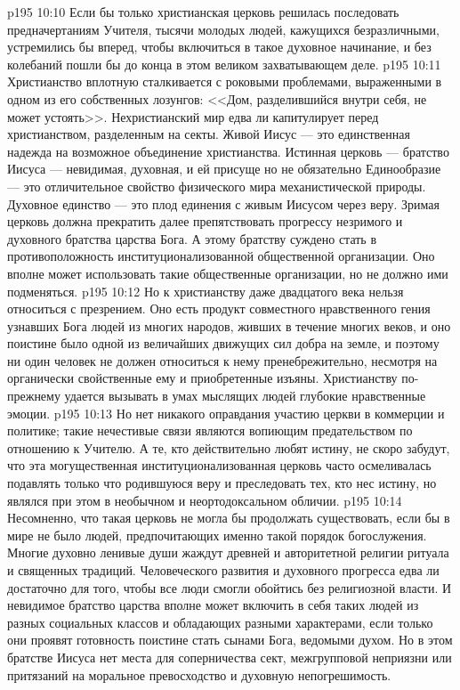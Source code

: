 \vs p195 10:10 Если бы только христианская церковь решилась последовать предначертаниям Учителя, тысячи молодых людей, кажущихся безразличными, устремились бы вперед, чтобы включиться в такое духовное начинание, и без колебаний пошли бы до конца в этом великом захватывающем деле.
\vs p195 10:11 Христианство вплотную сталкивается с роковыми проблемами, выраженными в одном из его собственных лозунгов: <<Дом, разделившийся внутри себя, не может устоять>>. Нехристианский мир едва ли капитулирует перед христианством, разделенным на секты. Живой Иисус --- это единственная надежда на возможное объединение христианства. Истинная церковь --- братство Иисуса --- невидимая, духовная, и ей присуще  но не обязательно  Единообразие --- это отличительное свойство физического мира механистической природы. Духовное единство --- это плод единения с живым Иисусом через веру. Зримая церковь должна прекратить далее препятствовать прогрессу незримого и духовного братства царства Бога. А этому братству суждено стать  в противоположность институционализованной общественной организации. Оно вполне может использовать такие общественные организации, но не должно ими подменяться.
\vs p195 10:12 Но к христианству даже двадцатого века нельзя относиться с презрением. Оно есть продукт совместного нравственного гения узнавших Бога людей из многих народов, живших в течение многих веков, и оно поистине было одной из величайших движущих сил добра на земле, и поэтому ни один человек не должен относиться к нему пренебрежительно, несмотря на органически свойственные ему и приобретенные изъяны. Христианству по\hyp{}прежнему удается вызывать в умах мыслящих людей глубокие нравственные эмоции.
\vs p195 10:13 Но нет никакого оправдания участию церкви в коммерции и политике; такие нечестивые связи являются вопиющим предательством по отношению к Учителю. А те, кто действительно любят истину, не скоро забудут, что эта могущественная институционализованная церковь часто осмеливалась подавлять только что родившуюся веру и преследовать тех, кто нес истину, но являлся при этом в необычном и неортодоксальном обличии.
\vs p195 10:14 Несомненно, что такая церковь не могла бы продолжать существовать, если бы в мире не было людей, предпочитающих именно такой порядок богослужения. Многие духовно ленивые души жаждут древней и авторитетной религии ритуала и священных традиций. Человеческого развития и духовного прогресса едва ли достаточно для того, чтобы все люди смогли обойтись без религиозной власти. И невидимое братство царства вполне может включить в себя таких людей из разных социальных классов и обладающих разными характерами, если только они проявят готовность поистине стать сынами Бога, ведомыми духом. Но в этом братстве Иисуса нет места для соперничества сект, межгрупповой неприязни или притязаний на моральное превосходство и духовную непогрешимость.
